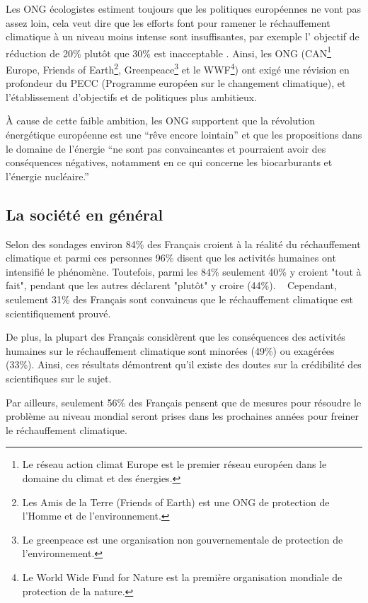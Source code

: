 \documentclass[a4paper,10pt]{article}
\begin{document}
Les ONG écologistes estiment toujours que les politiques européennes ne vont pas
assez loin,  cela veut dire que  les efforts font pour  ramener le réchauffement
climatique à un niveau moins intense sont insuffisantes, par exemple l' objectif 
de réduction de 20\% plutôt que 30\% est inacceptable .
  Ainsi, les ONG
(CAN\footnote{Le  réseau  action climat  Europe  est  le
  premier réseau européen dans le domaine du climat et des énergies.}
Europe, Friends  of Earth\footnote{Les Amis de  la Terre (Friends  of Earth) est
  une  ONG  de protection  de l'Homme  et de
  l'environnement.},
Greenpeace\footnote{ Le  greenpeace est une organisation  non gouvernementale de
  protection de l'environnement.}  et le  WWF\footnote{Le World  Wide Fund  for Nature  est  la première
  organisation mondiale de protection de  la nature.}) ont exigé une révision en
profondeur  du  PECC  (Programme  européen  sur le  changement  climatique),  et
l'établissement d'objectifs et de politiques plus ambitieux.  



À cause de cette faible ambition, les ONG supportent que la révolution énergétique
européenne est une ``rêve encore lointain'' et que les propositions
dans le domaine de l'énergie ``ne  sont pas convaincantes et pourraient avoir des
conséquences  négatives,  notamment en  ce  qui  concerne  les biocarburants  et
l'énergie nucléaire.''~\cite{ONG}


\subsection[La société en général]
{La société en général} 

Selon des sondages environ 84\% des Français croient à la réalité du réchauffement
climatique et  parmi ces  personnes  96\% disent que  les activités
humaines ont intensifié le phénomène.
Toutefois, parmi les 84\% seulement 40\% y croient "tout à fait", pendant que les autres déclarent "plutôt" y
croire (44\%). ~\cite{FR}
Cependant, seulement 31\% des Français sont convaincus que le réchauffement climatique est
scientifiquement prouvé.

De plus, la plupart des Français considèrent que les conséquences des activités humaines
sur le réchauffement climatique sont minorées (49\%) ou exagérées (33\%). 
Ainsi, ces résultats démontrent qu'il existe des doutes sur la crédibilité des scientifiques sur le
sujet. 

Par ailleurs, seulement 56\% des Français pensent que de mesures pour résoudre le
problème au niveau mondial seront prises dans  les prochaines années  pour freiner le réchauffement  climatique.
\end{document}

